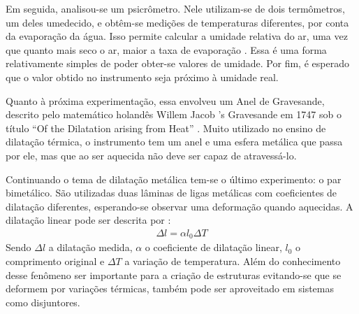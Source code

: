 Em seguida, analisou-se um psicrômetro. Nele utilizam-se de dois termômetros, um deles umedecido, e obtêm-se medições de temperaturas diferentes, por conta da evaporação da água. Isso permite calcular a umidade relativa do ar, uma vez que quanto mais seco o ar, maior a taxa de evaporação \cite{evaporacao}. Essa é uma forma relativamente simples de poder obter-se valores de umidade. Por fim, é esperado que o valor obtido no instrumento seja próximo à umidade real.

Quanto à próxima experimentação, essa envolveu um Anel de Gravesande, descrito pelo matemático holandês Willem Jacob 's Gravesande em 1747 sob o título “Of the Dilatation arising from Heat” \cite{Gravesande_Desaguliers_Adams_1747}. Muito utilizado no ensino de dilatação térmica, o instrumento tem um anel e uma esfera metálica que passa por ele, mas que ao ser aquecida não deve ser capaz de atravessá-lo.

Continuando o tema de dilatação metálica tem-se o último experimento: o par bimetálico. São utilizadas duas lâminas de ligas metálicas com coeficientes de dilatação diferentes, esperando-se observar uma deformação quando aquecidas. A dilatação linear pode ser descrita por \cite{Nussenzveig_2014}:
\begin{align*}
    \Delta l = \alpha l_0 \Delta T 
\end{align*}
Sendo \(\Delta l\) a dilatação medida, \(\alpha\) o coeficiente de dilatação linear, \(l_0\) o comprimento original e \(\Delta T\) a variação de temperatura. Além do conhecimento desse fenômeno ser importante para a criação de estruturas evitando-se que se deformem por variações térmicas, também pode ser aproveitado em sistemas como disjuntores.
\newpage
